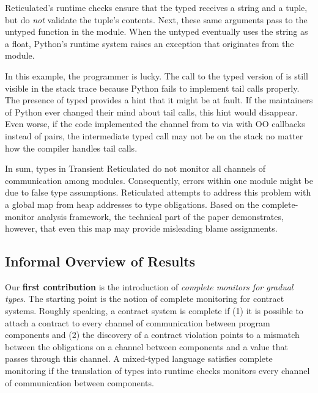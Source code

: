 Reticulated's runtime checks ensure that the typed  receives a
string and a tuple, but do {\em not\/} validate the tuple's contents.  Next,
these same arguments pass to the untyped  function in the
 module. When the untyped  eventually uses the string
 as a float, Python's runtime system raises an exception that
originates from the  module.

In this example, the programmer is lucky. The call to the typed version of
 is still visible in the stack trace because Python fails to
implement tail calls properly. The presence of typed  provides a hint
that it might be at fault. If the maintainers of Python ever changed their mind
about tail calls, this hint would disappear. Even worse, if the code implemented the
channel from  to  via  with OO
callbacks instead of pairs, the intermediate typed call may not be on the
stack no matter how the compiler handles tail calls.

In sum, types in Transient Reticulated
do not monitor all channels of communication among modules.
Consequently, errors within one module might be due to false type assumptions.
Reticulated attempts to address this problem with a global map
from heap addresses to type obligations.
Based on the complete-monitor analysis framework, the technical part of the
paper demonstrates, however, that even this map may provide misleading blame
assignments.

\subsection{Informal Overview of Results} \label{sub:results}

Our {\bf first contribution} is the introduction of {\em complete monitors for
gradual types\/}. The starting point is the notion of complete monitoring for
contract systems. Roughly speaking, a contract system is complete if (1) it is
possible to attach a contract to every channel of communication between
program components and (2) the discovery of a contract violation points to a
mismatch between the obligations on a channel between components and a value
that passes through this channel. A mixed-typed language satisfies complete
monitoring if the translation of types into runtime checks monitors
every channel of communication between components.

